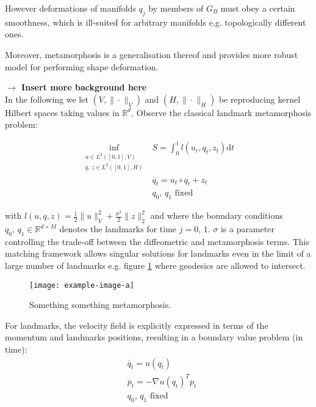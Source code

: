 \documentclass{article}
\newcommand{\half}{\frac 12}
\newcommand{\norm}[2]{\| #1 \|_{ #2 }}
\newcommand{\vnorm}[1]{\norm{ #1 }{V}}
\newcommand{\hnorm}[1]{\norm{ #1 }{H}}
\newcommand{\ltwonorm}[1]{\norm{ #1 }{2}}
\newcommand{\diff}[1]{\text{d} #1}
\newcommand{\Rd}{\mathbb{R}^{d}}
\newcommand{\RdM}{\mathbb{R}^{d\times M}}
\begin{document}
However deformations of manifolds $q_j$ by members of $G_B$ must obey a certain
smoothness, which is ill-suited for arbitrary manifolds e.g. topologically
different ones.

Moreover, metamorphosis is a generalisation thereof and provides more robust
model for performing shape deformation.

\textbf{$\longrightarrow$ Insert more background here}\\

In the following we let $(V,\vnorm{\cdot})$ and $(H,\hnorm{\cdot})$ be
reproducing kernel Hilbert spaces taking values in $\Rd$. Observe the classical
landmark metamorphosis problem: 

\begin{subequations}
\begin{align}
\inf_{\substack{u\in L^2([0,1],V)\\q,\, z \in L^2([0,1],H)}} & S = \int_0^1
l(u_t, q_t, z_t)\diff{t}\\
    & \dot{q_t} = u_t \circ q_t + z_t \\
    & q_0,\,q_1\text{ fixed}
\end{align}
\end{subequations}

with $l(u, q, z) = \half \vnorm{u}^2 + \frac{\sigma^2}2 \ltwonorm{z}^2$ and
where the boundary conditions $q_0,\,q_1 \in \RdM$ denotes the landmarks for
time $j=0,\,1$.  $\sigma$ is a parameter controlling the trade-off between the
diffeometric and metamorphosis terms. This matching framework allows singular
solutions for landmarks even in the limit of a large number of landmarks e.g.
figure \ref{fig:classic_mm} where geodesics are allowed to intersect.

\begin{figure}
  \centering
  \texttt{[image: example-image-a]}
  \caption{Something something metamorphosis.}
  \label{fig:classic_mm}
\end{figure}

For landmarks, the velocity field is explicitly expressed in terms of the
momentum and landmarks positions, resulting in a boundary value problem (in
time):
\begin{subequations}
\begin{align}
& \dot{q_t} = u(q_t)\\
& \dot{p_t} = - \nabla u(q_t)^T p_t\\
& q_0,\,q_1\text{ fixed}
\end{align}
\end{subequations}
\end{document}
